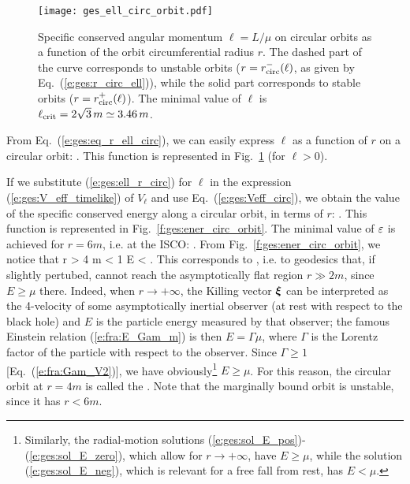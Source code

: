 \begin{figure}
\centerline{\texttt{[image: ges\_ell\_circ\_orbit.pdf]}}
\caption[]{\label{f:ges:ell_circ_orbit} \footnotesize
Specific conserved angular momentum $\ell = L/\mu$
on circular orbits as a function of the
orbit circumferential radius $r$. The dashed part of the curve
corresponds to unstable orbits ($r=r_{\rm circ}^-(\ell)$, as given by Eq.~(\ref{e:ges:r_circ_ell})), while
the solid part corresponds to stable orbits ($r=r_{\rm circ}^+(\ell)$).
The minimal value of $\ell$ is $\ell_{\rm crit} = 2\sqrt{3}\, m \simeq 3.46\, m$.}
\end{figure}

From Eq.~(\ref{e:ges:eq_r_ell_circ}), we can easily express $\ell$
as a function of $r$ on a circular orbit:
\be \label{e:ges:ell_r_circ}
     .
\ee
This function is represented in Fig.~\ref{f:ges:ell_circ_orbit} (for $\ell > 0$).

If we substitute (\ref{e:ges:ell_r_circ}) for $\ell$ in
the expression (\ref{e:ges:V_eff_timelike}) of $V_{\ell}$
and use Eq.~(\ref{e:ges:Veff_circ}), we obtain the value of the
specific conserved energy along a circular orbit, in terms of $r$:
\be \label{e:ges:eps_r_circ}
     .
\ee
This function is represented in Fig.~\ref{f:ges:ener_circ_orbit}.
The minimal value of $\varepsilon$ is achieved for $r=6m$, i.e. at the ISCO:
\be
     .
\ee
From Fig.~\ref{f:ges:ener_circ_orbit}, we notice that
\be \label{e:ges:r_marginally_bound}
    r > 4 m \iff \veps < 1 \iff E < \mu .
\ee
This corresponds to ,
i.e. to geodesics that, if slightly pertubed, cannot reach the asymptotically
flat region $r\gg 2m$, since $E \geq \mu$ there. Indeed, when
$r\rightarrow +\infty$, the Killing vector $\bm{\xi}$ can be interpreted
as the 4-velocity of some asymptotically inertial observer (at rest with
respect to the black hole) and $E$ is the particle energy measured by
that observer; the famous Einstein relation (\ref{e:fra:E_Gam_m}) is then
$E = \Gamma \mu$, where $\Gamma$ is the Lorentz factor
of the particle with respect to the observer.
Since $\Gamma \geq 1$ [Eq.~(\ref{e:fra:Gam_V2})], we have obviously\footnote{Similarly,
the radial-motion solutions (\ref{e:ges:sol_E_pos})-(\ref{e:ges:sol_E_zero}), which
allow for $r\rightarrow +\infty$, have $E \geq\mu$, while the solution (\ref{e:ges:sol_E_neg}),
which is relevant for a free fall from rest, has $E < \mu$.} $E \geq \mu$.
For this reason, the circular orbit at $r=4m$ is called the
. Note that the marginally bound orbit is unstable, since it has $r<6m$.

